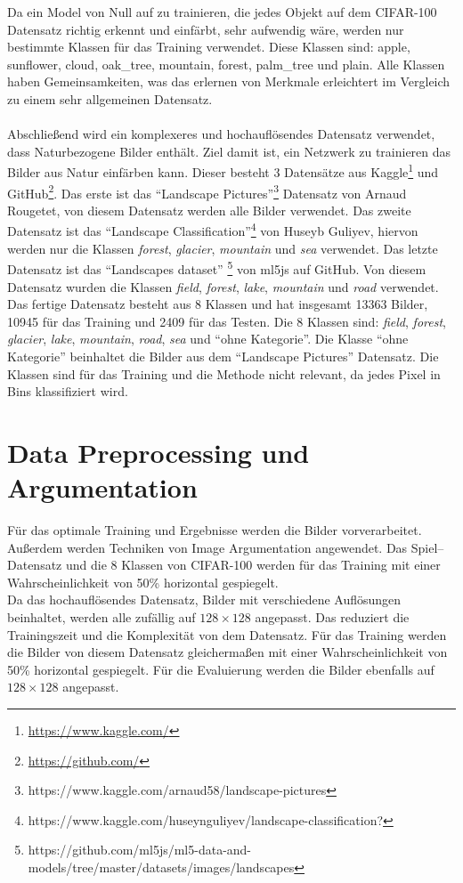 Da ein Model von Null auf zu trainieren, die jedes Objekt auf dem CIFAR-100 Datensatz richtig erkennt und einfärbt, sehr aufwendig wäre, werden
nur bestimmte Klassen für das Training verwendet. Diese Klassen sind: apple, sunflower, cloud, oak\_tree, mountain, forest, palm\_tree und plain.
Alle Klassen haben Gemeinsamkeiten, was das erlernen von Merkmale erleichtert im Vergleich zu einem sehr allgemeinen Datensatz.
\\
\\
Abschließend wird ein komplexeres und hochauflösendes Datensatz verwendet, dass Naturbezogene Bilder enthält. Ziel damit ist, ein Netzwerk zu
trainieren das Bilder aus Natur einfärben kann. Dieser besteht 3 Datensätze aus 
Kaggle\footnote{\url{https://www.kaggle.com/}} und GitHub\footnote{\url{https://github.com/}}. 
Das erste ist das ``Landscape Pictures''\footnote{https://www.kaggle.com/arnaud58/landscape-pictures} Datensatz von Arnaud Rougetet, von diesem
Datensatz werden alle Bilder verwendet. Das zweite Datensatz ist das 
``Landscape Classification''\footnote{https://www.kaggle.com/huseynguliyev/landscape-classification?} von Huseyb Guliyev, hiervon werden nur
die Klassen \textit{forest}, \textit{glacier}, \textit{mountain} und \textit{sea} verwendet. Das letzte Datensatz ist das ``Landscapes dataset''
\footnote{https://github.com/ml5js/ml5-data-and-models/tree/master/datasets/images/landscapes} von ml5js auf GitHub. Von diesem Datensatz wurden
die Klassen \textit{field}, \textit{forest}, \textit{lake}, \textit{mountain} und \textit{road} verwendet.
\\
Das fertige Datensatz besteht aus 8 Klassen und hat insgesamt
13363 Bilder, 10945 für das Training und 2409 für das Testen. Die 8 Klassen sind: \textit{field}, \textit{forest}, \textit{glacier}, 
\textit{lake}, \textit{mountain}, \textit{road}, \textit{sea} und ``ohne Kategorie''. 
Die Klasse ``ohne Kategorie'' beinhaltet die Bilder aus dem ``Landscape Pictures'' Datensatz. Die Klassen sind für das Training und 
die Methode nicht relevant, da jedes Pixel in Bins klassifiziert wird.

\section{Data Preprocessing und Argumentation}
Für das optimale Training und Ergebnisse werden die Bilder vorverarbeitet. Außerdem werden Techniken von Image Argumentation angewendet.
Das Spiel–Datensatz und die 8 Klassen von CIFAR-100 werden für das Training mit einer Wahrscheinlichkeit von 50\% horizontal gespiegelt.
\\
Da das hochauflösendes Datensatz, Bilder mit verschiedene Auflösungen beinhaltet, werden alle zufällig auf $ 128 \times 128 $ angepasst. Das 
reduziert die Trainingszeit und die Komplexität von dem Datensatz. Für das Training werden die Bilder von diesem Datensatz gleichermaßen mit einer 
Wahrscheinlichkeit von 50\% horizontal gespiegelt. Für die Evaluierung werden die Bilder ebenfalls auf $ 128 \times 128 $ angepasst.


